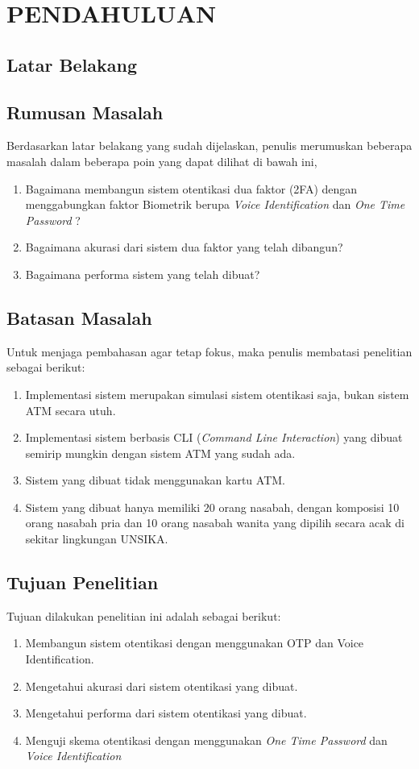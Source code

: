 \chapter{PENDAHULUAN}

\section{Latar Belakang}
	\lipsum
\section{Rumusan Masalah}
Berdasarkan latar belakang yang sudah dijelaskan, penulis merumuskan beberapa masalah dalam beberapa poin yang dapat dilihat di bawah ini,
\begin{enumerate}
\item Bagaimana membangun sistem otentikasi dua faktor (2FA) dengan menggabungkan faktor Biometrik berupa \textit{Voice Identification} dan \textit{One Time Password} ?
\item Bagaimana akurasi dari sistem dua faktor yang telah dibangun?
\item Bagaimana performa sistem yang telah dibuat?
\end{enumerate}

\section{Batasan Masalah}
Untuk menjaga pembahasan agar tetap fokus, maka penulis membatasi penelitian sebagai berikut:
\begin{enumerate}
	\item Implementasi sistem merupakan simulasi sistem otentikasi saja, bukan sistem ATM secara utuh.
	\item Implementasi sistem berbasis CLI (\textit{Command Line Interaction}) yang dibuat semirip mungkin dengan sistem ATM yang sudah ada.
	\item Sistem yang dibuat tidak menggunakan kartu ATM.
	\item Sistem yang dibuat hanya memiliki 20 orang nasabah, dengan komposisi 10 orang nasabah pria dan 10 orang nasabah wanita yang dipilih secara acak di sekitar lingkungan UNSIKA.
\end{enumerate}
\section{Tujuan Penelitian}
Tujuan dilakukan penelitian ini adalah sebagai berikut:
\begin{enumerate}
	\item Membangun sistem otentikasi dengan menggunakan OTP dan Voice Identification.
	\item Mengetahui akurasi dari sistem otentikasi yang dibuat.
	\item Mengetahui performa dari sistem otentikasi yang dibuat.
	\item Menguji skema otentikasi dengan menggunakan \textit{One Time Password} dan \textit{Voice Identification}
\end{enumerate}
